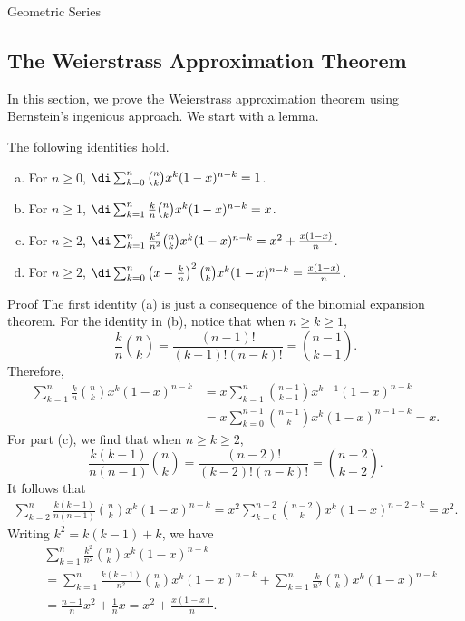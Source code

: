\begin{example}[label=230305_16]{Geometric Series}
\begin{example}[label=230304_9]{}
\begin{example}{}
\begin{example}{}
 \bigskip
\subsection{The Weierstrass Approximation Theorem}\label{sec6.6.5}
In this section, we prove the Weierstrass approximation theorem using Bernstein's ingenious approach. We start with a  lemma.

\begin{lemma}[label=230309_14]{}
The following identities hold.
\begin{enumerate}[(a)]
\item For $n\geq 0$, $\di\sum_{k=0}^n\binom{n}{k}x^k(1-x)^{n-k}=1$.
\item For $n\geq 1$, $\di\sum_{k=1}^n\frac{k}{n}\binom{n}{k}x^k(1-x)^{n-k}=x$.

\item For $n\geq 2$, $\di\sum_{k=1}^n\frac{k^2}{n^2}\binom{n}{k}x^k(1-x)^{n-k}=x^2+\frac{x(1-x)}{n}$.
\item For $n\geq 2$, $\di\sum_{k=0}^n\left(x-\frac{k}{n}\right)^2\binom{n}{k}x^k(1-x)^{n-k}=\frac{x(1-x)}{n}$.
 \end{enumerate}
\end{lemma}
\begin{myproof}{Proof}
The first  identity  (a)
is just a consequence of the binomial expansion theorem.
\bp
 For the   identity in (b), notice that when $n\geq k\geq 1$,
\[\frac{k}{n}\binom{n}{k}=\frac{(n-1)!}{(k-1)!(n-k)!}=\binom{n-1}{k-1}.\]
Therefore, 
\begin{align*}\sum_{k=1}^n\frac{k}{n}\binom{n}{k}x^k(1-x)^{n-k}&=x\sum_{k=1}^n\binom{n-1}{k-1}x^{k-1}(1-x)^{n-k}\\&=x\sum_{k=0}^{n-1}\binom{n-1}{k}x^k(1-x)^{n-1-k}=x.\end{align*}
 For part (c), we find that when $n\geq k\geq 2$,
\[\frac{k(k-1)}{n(n-1)}\binom{n}{k}=\frac{(n-2)!}{(k-2)!(n-k)!}=\binom{n-2}{k-2}.\]  It follows that
\begin{align*}\sum_{k=2}^n\frac{k(k-1)}{n(n-1)}\binom{n}{k}x^k(1-x)^{n-k} =x^2\sum_{k=0}^{n-2}\binom{n-2}{k}x^k(1-x)^{n-2-k}=x^2.\end{align*}
Writing  $k^2=k(k-1)+k$, we have
\begin{align*}
&\sum_{k=1}^n\frac{k^2}{n^2}\binom{n}{k}x^k(1-x)^{n-k}\\&=\sum_{k=1}^n\frac{k(k-1)}{n^2}\binom{n}{k}x^k(1-x)^{n-k}+\sum_{k=1}^n\frac{k }{n^2}\binom{n}{k}x^k(1-x)^{n-k}\\
&=\frac{n-1}{n}x^2+\frac{1}{n}x=x^2+\frac{x(1-x)}{n}.
\end{align*} 


\end{myproof}
\end{example}
\end{example}
\end{example}
\end{example}
